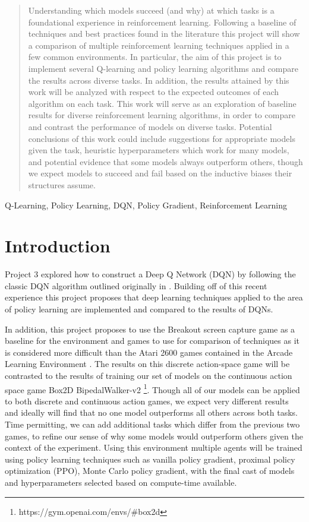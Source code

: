 \documentclass[conference]{IEEEtran}
\begin{document}
\begin{abstract}
    Understanding which models succeed (and why) at which tasks is a foundational experience in reinforcement learning.
    Following a baseline of techniques and best practices found in the literature this project will show a comparison of multiple reinforcement learning techniques applied in a few common environments.
    In particular, the aim of this project is to implement several Q-learning and policy learning algorithms and compare the results across diverse tasks.
    In addition, the results attained by this work will be analyzed with respect to the expected outcomes of each algorithm on each task.
    This work will serve as an exploration of baseline results for diverse reinforcement learning algorithms, in order to compare and contrast the performance of models on diverse tasks.
    Potential conclusions of this work could include suggestions for appropriate models given the task, heuristic hyperparameters which work for many models, and potential evidence that some models always outperform others, though we expect models to succeed and fail based on the inductive biases their structures assume.
\end{abstract}

\begin{IEEEkeywords}
Q-Learning, Policy Learning, DQN, Policy Gradient, Reinforcement Learning
\end{IEEEkeywords}

\section{Introduction}
Project 3 explored how to construct a Deep Q Network (DQN) by following the classic DQN algorithm outlined originally in \cite{DQNOriginalPaper}.
Building off of this recent experience this project proposes that deep learning techniques applied to the area of policy learning are implemented and compared to the results of DQNs.

In addition, this project proposes to use the Breakout screen capture game as a baseline for the environment and games to use for comparison of techniques as it is considered more difficult than the Atari 2600 games contained in the Arcade Learning Environment \cite{Bellemare_2013, DQNOriginalPaper}. The results on this discrete action-space game will be contrasted to the results of training our set of models on the continuous action space game Box2D BipedalWalker-v2 \footnote{https://gym.openai.com/envs/\#box2d}. Though all of our models can be applied to both discrete and continuous action games, we expect very different results and ideally will find that no one model outperforms all others across both tasks. Time permitting, we can add additional tasks which differ from the previous two games, to refine our sense of why some models would outperform others given the context of the experiment.
Using this environment multiple agents will be trained using policy learning techniques such as vanilla policy gradient, proximal policy optimization (PPO), Monte Carlo policy gradient, with the final cast of models and hyperparameters selected based on compute-time available.
\end{document}
